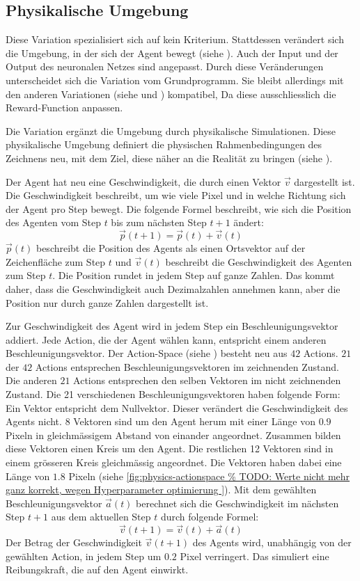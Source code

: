 \subsection{Physikalische Umgebung}\label{sub:m_var_phy}
Diese Variation spezialisiert sich auf kein Kriterium. Stattdessen verändert
sich die Umgebung, in der sich der Agent bewegt (siehe ).
Auch der Input und der Output des neuronalen Netzes sind angepasst. Durch diese
Veränderungen unterscheidet sich die Variation vom Grundprogramm. Sie bleibt
allerdings mit den anderen Variationen (siehe  und
) kompatibel, Da diese ausschliesslich die
Reward-Function anpassen.

Die Variation ergänzt die Umgebung durch physikalische Simulationen. Diese
physikalische Umgebung definiert die physischen Rahmenbedingungen des Zeichnens
neu, mit dem Ziel, diese näher an die Realität zu bringen (siehe
). 

Der Agent hat neu eine Geschwindigkeit, die durch einen Vektor $\vec{v}$
dargestellt ist. Die Geschwindigkeit beschreibt, um wie viele Pixel und in
welche Richtung sich der Agent pro Step bewegt. Die folgende Formel beschreibt,
wie sich die Position des Agenten vom Step $t$ bis zum nächsten Step $t+1$
ändert:
\[ \vec{p}(t+1) = \vec{p}(t) + \vec{v}(t) \] 
$\vec{p}(t)$ beschreibt die Position des Agents als einen Ortsvektor auf der
Zeichenfläche zum Step $t$ und $\vec{v}(t)$ beschreibt die Geschwindigkeit des
Agenten zum Step $t$. Die Position rundet in jedem Step auf ganze Zahlen. Das
kommt daher, dass die Geschwindigkeit auch Dezimalzahlen annehmen kann, aber die
Position nur durch ganze Zahlen dargestellt ist.

Zur Geschwindigkeit des Agent wird in jedem Step ein Beschleunigungsvektor
addiert. Jede Action, die der Agent wählen kann, entspricht einem anderen
Beschleunigungsvektor. Der Action-Space (siehe ) besteht
neu aus $42$ Actions. $21$ der $42$ Actions entsprechen Beschleunigungsvektoren
im zeichnenden Zustand. Die anderen $21$ Actions entsprechen den selben Vektoren
im nicht zeichnenden Zustand. Die 21 verschiedenen Beschleunigungsvektoren haben
folgende Form: Ein Vektor entspricht dem Nullvektor. Dieser verändert die
Geschwindigkeit des Agents nicht. $8$ Vektoren sind um den Agent herum mit
einer Länge von $0.9$ Pixeln in gleichmässigem Abstand von einander angeordnet. %
Zusammen bilden diese Vektoren einen Kreis um den Agent. Die restlichen 12
Vektoren sind in einem grösseren Kreis gleichmässig angeordnet. Die Vektoren
haben dabei eine Länge von $1.8$ Pixeln (siehe \autoref{fig:physics-actionspace %
}).  Mit dem gewählten Beschleunigungsvektor $\vec{a}(t)$ berechnet sich die
Geschwindigkeit im nächsten Step $t+1$ aus dem aktuellen Step $t$ durch folgende
Formel:
\[ \vec{v}(t+1) = \vec{v}(t) + \vec{a}(t) \] 
Der Betrag der Geschwindigkeit $\vec{v}(t+1)$ des Agents wird, unabhängig von
der gewählten Action, in jedem Step um $0.2$ Pixel verringert. Das simuliert eine  %
Reibungskraft, die auf den Agent einwirkt.

